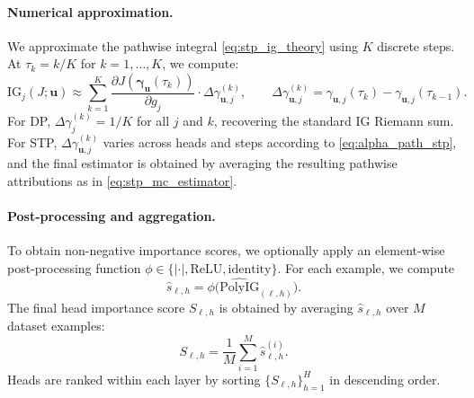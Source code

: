 \paragraph*{Numerical approximation.}
We approximate the pathwise integral \eqref{eq:stp_ig_theory} using $K$ discrete steps. At $\tau_k = k/K$ for $k = 1, \dots, K$, we compute:
\begin{equation}
\mathrm{IG}_{j}(J;\mathbf{u}) \approx \sum_{k=1}^{K} \frac{\partial J(\boldsymbol{\gamma}_{\mathbf{u}}(\tau_k))}{\partial g_{j}} \cdot \Delta \gamma_{\mathbf{u},j}^{(k)},
\qquad \Delta \gamma_{\mathbf{u},j}^{(k)} = \gamma_{\mathbf{u},j}(\tau_k)-\gamma_{\mathbf{u},j}(\tau_{k-1}).
\label{eq:ig_gate}
\end{equation}
For DP, $\Delta \gamma_j^{(k)} = 1/K$ for all $j$ and $k$, recovering the standard IG Riemann sum. For STP, $\Delta \gamma_{\mathbf{u},j}^{(k)}$ varies across heads and steps according to \eqref{eq:alpha_path_stp}, and the final estimator is obtained by averaging the resulting pathwise attributions as in \eqref{eq:stp_mc_estimator}.

\paragraph*{Post-processing and aggregation.}
To obtain non-negative importance scores, we optionally apply an element-wise post-processing function $\phi \in \{|\cdot|, \mathrm{ReLU}, \mathrm{identity}\}$. For each example, we compute
\begin{equation}
\hat{s}_{\ell,h} = \phi\big(\widehat{\mathrm{PolyIG}}_{(\ell,h)}\big).
\end{equation}
The final head importance score $S_{\ell,h}$ is obtained by averaging $\hat{s}_{\ell,h}$ over $M$ dataset examples:
\begin{equation}
S_{\ell,h} = \frac{1}{M} \sum_{i=1}^{M} \hat{s}_{\ell,h}^{(i)}.
\end{equation}
Heads are ranked within each layer by sorting $\{S_{\ell,h}\}_{h=1}^{H}$ in descending order.

